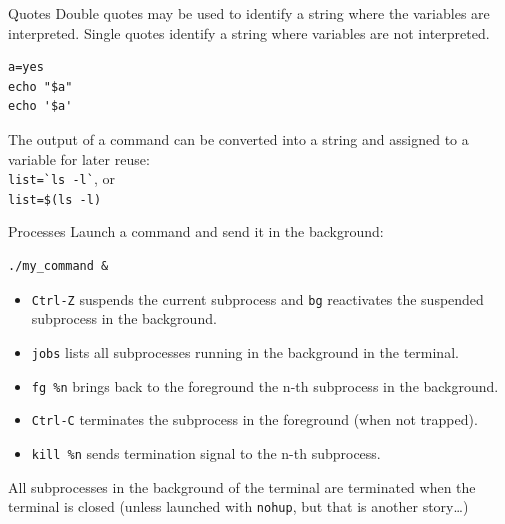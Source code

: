 \documentclass{beamer}
\begin{document}
\begin{frame}[fragile]{Quotes}
Double quotes may be used to identify a string where the variables
are interpreted. Single quotes identify a string where variables are not interpreted.
\begin{lstlisting}
a=yes
echo "$a"
echo '$a'
\end{lstlisting}
The output of a command can be converted into a string and assigned to a variable for later reuse:\\
\texttt{list=\`{}ls -l\`{}}, or\\
\texttt{list=\$(ls -l)}
\end{frame}

\begin{frame}[fragile]{Processes}
Launch a command and send it in the background:
\begin{lstlisting}
./my_command &
\end{lstlisting}

\begin{itemize}
\item \texttt{Ctrl-Z} suspends the current subprocess and \texttt{bg} reactivates the suspended subprocess in the background.

\item \texttt{jobs} lists all subprocesses running in the background in the terminal.

\item \texttt{fg \%n} brings back to the foreground the n-th subprocess in the background.

\item \texttt{Ctrl-C} terminates the subprocess in the foreground (when not trapped).

\item \texttt{kill \%n} sends termination signal to the n-th subprocess.
\end{itemize}

All subprocesses in the background of the terminal are terminated when the terminal is closed (unless launched with \texttt{nohup}, but that is another story\dots)
\end{frame}
\end{document}
